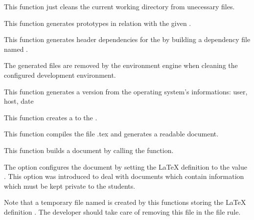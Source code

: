          {
	   This function just cleans the current working directory from
	   unecessary files.
	 }

         {
	   This function generates prototypes in relation with the given
	   .
	 }

         {
	   This function generates header dependencies for the 
	   by building a  dependency file named
	   .

	   \-

	   The generated files  are removed by
	   the environment engine when cleaning the configured development
	   environment.
	 }

         {
	   This function generates a version  from the operating
	   system's informations: user, host, date \etc{}
	 }

         {
	   This function creates a  to the .
	 }

         {
	   This function compiles the file .tex and
	   generates a readable document.
	 }

         {
	   This function builds a document by calling the
            function.

	   \-

           The option  configures the document
	   by setting the {\LaTeX} definition  to
	   the value . This option was introduced to deal with
	   documents which contain information which must be kept private to
	   the students.

	   \-

	   Note that a temporary file named 
	   is created by this functions storing the {\LaTeX} definition
	   . The developer should take care of
	   removing this file in the   file rule.
	 }

